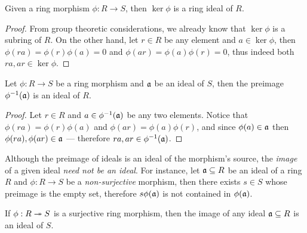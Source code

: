 \begin{corollary}
    \label{cor:kernel-is-ideal}
    Given a ring morphism \(\phi: R \to S\), then \(\ker \phi\) is a ring ideal of
    \(R\).
\end{corollary}

\begin{proof}
    From group theoretic considerations, we already know that \(\ker \phi\) is a
    subring of \(R\). On the other hand, let \(r \in R\) be any element and \(a \in
    \ker \phi\), then \(\phi(r a) = \phi(r) \phi(a) = 0\) and \(\phi(a r) = \phi(a)
    \phi(r) = 0\), thus indeed both \(r a, a r \in \ker \phi\).
\end{proof}

\begin{corollary}
    \label{cor:inverse-image-of-ideal-is-ideal}
    Let \(\phi: R \to S\) be a ring morphism and \(\mathfrak{a}\) be an ideal of \(S\),
    then the preimage \(\phi^{-1}(\mathfrak{a})\) is an ideal of \(R\).
\end{corollary}

\begin{proof}
    Let \(r \in R\) and \(a \in \phi^{-1}(\mathfrak{a})\) be any two elements. Notice
    that \(\phi(r a) = \phi(r) \phi(a)\) and \(\phi(a r) = \phi(a) \phi(r)\), and
    since \(\phi(a) \in \mathfrak{a}\) then \(\phi(r a), \phi(a r) \in \mathfrak{a}\) ---
    therefore \(r a, a r \in \phi^{-1}(\mathfrak{a})\).
\end{proof}

\begin{remark}
    \label{rem:image-of-ideal-need-not-be-ideal}
    Although the preimage of ideals is an ideal of the morphism's source, the
    \emph{image} of a given ideal \emph{need not be an ideal}. For instance, let
    \(\mathfrak{a} \subseteq R\) be an ideal of a ring \(R\) and \(\phi: R \to S\) be a
    \emph{non-surjective} morphism, then there exists \(s \in S\) whose preimage is
    the empty set, therefore \(s \phi(\mathfrak{a})\) is not contained in
    \(\phi(\mathfrak{a})\).
\end{remark}

\begin{corollary}
    \label{cor:surjective-preserve-ideals}
    If \(\phi: R \twoheadrightarrow S\) is a surjective ring morphism, then the image of any ideal
    \(\mathfrak{a} \subseteq R\) is an ideal of \(S\).
\end{corollary}

